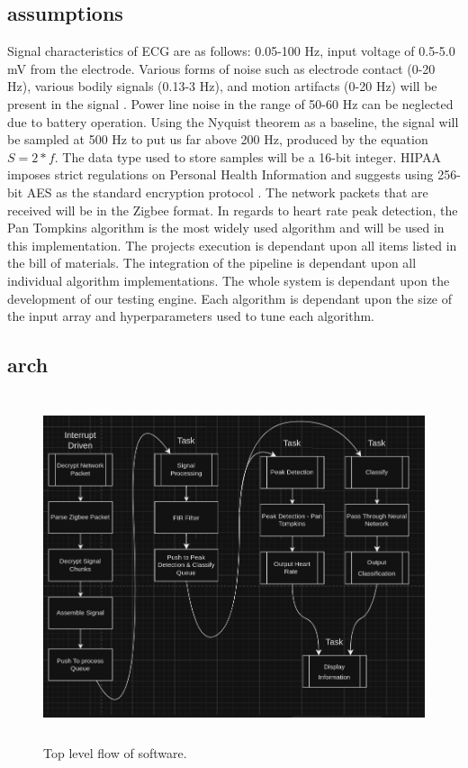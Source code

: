 \documentclass{article}
\begin{document}
\subsection{\gls{assumptions}}
Signal characteristics of ECG are as follows: 0.05-100 Hz, input voltage of 0.5-5.0 mV from the electrode. Various forms of noise such as electrode contact (0-20 Hz), various bodily signals (0.13-3 Hz), and motion artifacts (0-20 Hz) will be present in the signal \cite{ecgfiltering}. Power line noise in the range of 50-60 Hz can be neglected due to battery operation. Using the Nyquist theorem as a baseline, the signal will be sampled at 500 Hz to put us far above 200 Hz, produced by the equation $S = 2 * f$. The data type used to store samples will be a 16-bit integer. HIPAA imposes strict regulations on Personal Health Information and suggests using 256-bit AES as the standard encryption protocol \cite{sprinto}. The network packets that are received will be in the Zigbee format. In regards to heart rate peak detection, the Pan Tompkins algorithm is the most widely used algorithm \cite{pantompkins} and will be used in this implementation. The projects execution is dependant upon all items listed in the bill of materials. The integration of the pipeline is dependant upon all individual algorithm implementations. The whole system is dependant upon the development of our testing engine. Each algorithm is dependant upon the size of the input array and hyperparameters used to tune each algorithm.

\newpage
\subsection{\gls{arch}}

\begin{figure}[h]
    \centering
    \includegraphics[width=5in, height=4in]{flow1.png}
    \caption{Top level flow of software.}
\end{figure}
\end{document}
